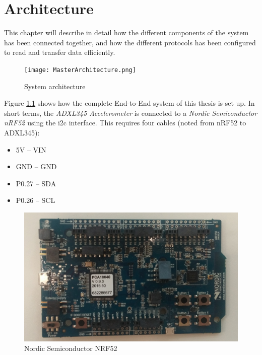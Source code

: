 \chapter{Architecture}
\label{chp:architecture} 

This chapter will describe in detail how the different components of the system has been connected together, and how the different protocols has been configured to read and transfer data efficiently. 


\begin{figure}[h]
    \centering
    \texttt{[image: MasterArchitecture.png]}    \caption{System architecture}
    \label{fig:systemArchitecture}
\end{figure}

\newpage

Figure \ref{fig:systemArchitecture} shows how the complete End-to-End system of this thesis is set up. In short terms, the \textit{ADXL345 Accelerometer} is connected to a \textit{Nordic Semiconductor nRF52} using the \gls{i2c} interface. This requires four cables (noted from nRF52 to ADXL345): 

\begin{itemize}
  \item 5V -- VIN 
  \item GND -- GND 
  \item P0.27 -- SDA
  \item P0.26 -- SCL
\end{itemize}


\begin{figure}[h]
    \centering
    \includegraphics[scale=0.32]{nrf52.png}    \caption{Nordic Semiconductor NRF52}
    \label{fig:adxl345}
\end{figure}

